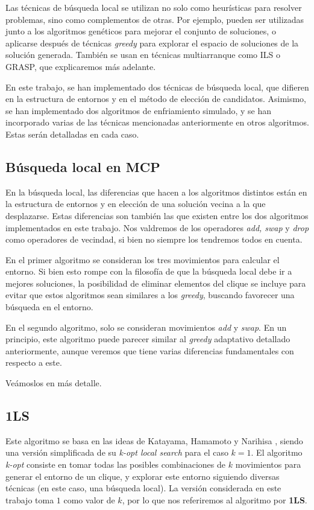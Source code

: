 Las técnicas de búsqueda local se utilizan no solo como heurísticas para resolver
problemas, sino como complementos de otras. Por ejemplo, pueden ser utilizadas junto
a los algoritmos genéticos para mejorar el conjunto de soluciones, o aplicarse después
de técnicas \textit{greedy} para explorar el espacio de soluciones de la solución
generada. También se usan en técnicas multiarranque como ILS o GRASP, que explicaremos
más adelante.

En este trabajo, se han implementado dos técnicas de búsqueda local, que difieren en
la estructura de entornos y en el método de elección de candidatos. Asimismo, se han
implementado dos algoritmos de enfriamiento simulado, y se han incorporado varias de
las técnicas mencionadas anteriormente en otros algoritmos. Estas serán detalladas en cada caso.

\subsection{Búsqueda local en MCP}

En la búsqueda local, las diferencias que hacen a los algoritmos distintos están en la estructura
de entornos y en elección de una solución vecina a la que desplazarse. Estas diferencias son
también las que existen entre los dos algoritmos implementados en este trabajo. Nos valdremos
de los operadores \textit{add, swap} y \textit{drop} como operadores de vecindad, si bien no
siempre los tendremos todos en cuenta.

En el primer algoritmo se consideran los tres movimientos para calcular el entorno.
Si bien esto rompe con la filosofía de que la búsqueda local debe ir a mejores soluciones,
la posibilidad de eliminar elementos del clique se incluye para evitar que estos algoritmos
sean similares a los \textit{greedy}, buscando favorecer una búsqueda en el entorno.

En el segundo algoritmo, solo se consideran movimientos \textit{add} y \textit{swap}.
En un principio, este algoritmo puede parecer similar al \textit{greedy} adaptativo
detallado anteriormente, aunque veremos que tiene varias diferencias fundamentales
con respecto a este.

Veámoslos en más detalle.

\subsection{1LS}\label{1ls}

Este algoritmo se basa en las ideas de Katayama, Hamamoto y Narihisa \citep{katayama:2005},
siendo una versión simplificada de su \textit{k-opt local search} para el caso $k = 1$.
El algoritmo \textit{k-opt} consiste en tomar todas las posibles combinaciones de $k$
movimientos para generar el entorno de un clique, y explorar este entorno siguiendo
diversas técnicas (en este caso, una búsqueda local). La versión considerada en este
trabajo toma $1$ como valor de $k$, por lo que nos referiremos al algoritmo por \textbf{1LS}.

